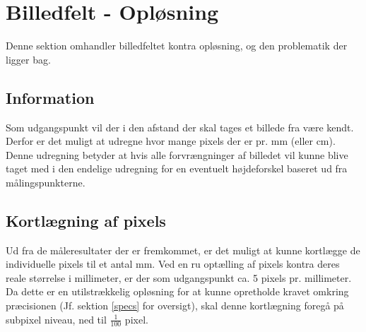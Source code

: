 \section{Billedfelt - Opløsning}

Denne sektion omhandler billedfeltet kontra opløsning, og den problematik der ligger bag.

\subsection{Information}

Som udgangspunkt vil der i den afstand der skal tages et billede fra være kendt. Derfor er det muligt at udregne hvor mange pixels der er pr. mm (eller cm). Denne udregning betyder at hvis alle forvrængninger af billedet vil kunne blive taget med i den endelige udregning for en eventuelt højdeforskel baseret ud fra målingspunkterne.

\subsection{\label{ref:kort}Kortlægning af pixels}

Ud fra de måleresultater der er fremkommet, er det muligt at kunne kortlægge de individuelle pixels til et antal mm. Ved en ru optælling af pixels kontra deres reale størrelse i millimeter, er der som udgangspunkt ca. 5 pixels pr. millimeter.
Da dette er en utilstrækkelig opløsning for at kunne opretholde kravet omkring præcisionen (Jf. sektion \ref{specs} for oversigt), skal denne kortlægning foregå på subpixel niveau, ned til $\frac{1}{100}$ pixel.

